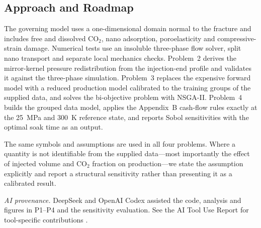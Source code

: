 \subsection{Approach and Roadmap}

The governing model uses a one-dimensional domain normal to the fracture
and includes free and dissolved CO$_2$, nano adsorption, poroelasticity and
compressive-strain damage. Numerical tests use an insoluble three-phase
flow solver, split nano transport and separate local mechanics checks. Problem~2 derives the mirror-kernel pressure redistribution
from the injection-end profile and validates it against the three-phase
simulation. Problem~3 replaces the expensive forward model with a reduced
production model calibrated to the training groups of the supplied data, and
solves the bi-objective problem with NSGA-II. Problem~4 builds the grouped
data model, applies the Appendix~B cash-flow rules exactly at the 25~MPa and
300~K reference state, and reports Sobol sensitivities with the optimal soak
time as an output.

The same symbols and assumptions are used in all four problems. Where a
quantity is not identifiable from the supplied data---most importantly the
effect of injected volume and CO$_2$ fraction on production---we state the
assumption explicitly and report a structural sensitivity rather than
presenting it as a calibrated result.

\noindent\textit{AI provenance.} DeepSeek and OpenAI Codex assisted the
code, analysis and figures in P1--P4 and the sensitivity evaluation.
See the AI Tool Use Report for tool-specific contributions \cite{deepseek,codex}.
